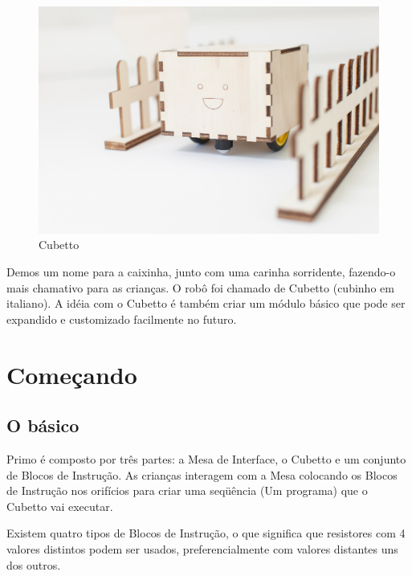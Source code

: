\documentclass[paper=a4, fontsize=11pt]{scrartcl} %
\numberwithin{equation}{section} %
\numberwithin{figure}{section} %
\numberwithin{table}{section} %
\begin{document}
  
  \begin{figure}[h] %
   \centering
   \includegraphics[scale=0.15]{./imagens/cubetto.jpg}
   \caption[ ]{Cubetto}
   \end{figure}
 
 Demos um nome para a caixinha, junto com uma carinha sorridente, fazendo-o mais chamativo para as crianças. O robô foi chamado de Cubetto (cubinho em italiano). A idéia com o Cubetto é também criar um módulo básico que pode ser expandido e customizado facilmente no futuro.

  
   
\section{Começando}
\subsection{O básico}

Primo é composto por três partes: a Mesa de Interface, o Cubetto e um conjunto de Blocos de Instrução. As crianças interagem com a Mesa colocando os Blocos de Instrução nos orifícios para criar uma seqüência (Um programa) que o Cubetto vai executar.

Existem quatro tipos de Blocos de Instrução, o que significa que resistores com 4 valores distintos podem ser usados, preferencialmente com valores distantes uns dos outros.
\end{document}
